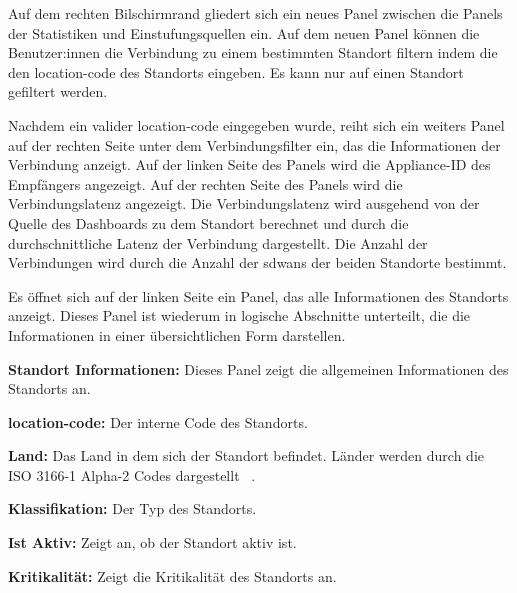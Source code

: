 \begin{compactitem}
\begin{compactitem}
        Auf dem rechten Bilschirmrand gliedert sich ein neues Panel zwischen die Panels der Statistiken und Einstufungsquellen ein.
        Auf dem neuen Panel können die Benutzer:innen die Verbindung zu einem bestimmten Standort filtern 
        indem die den \gls{location-code} des Standorts eingeben. Es kann nur auf einen Standort gefiltert werden.
        
        Nachdem ein valider \gls{location-code} eingegeben wurde, 
        reiht sich ein weiters Panel auf der rechten Seite unter dem Verbindungsfilter ein, das die Informationen der Verbindung anzeigt.
        Auf der linken Seite des Panels wird die Appliance-ID des Empfängers angezeigt.
        Auf der rechten Seite des Panels wird die Verbindungslatenz angezeigt.
        Die Verbindungslatenz wird ausgehend von der Quelle des Dashboards zu dem Standort berechnet
        und durch die durchschnittliche Latenz der Verbindung dargestellt.
        Die Anzahl der Verbindungen wird durch die Anzahl der \gls{sdwan}s der beiden Standorte bestimmt.

        Es öffnet sich auf der linken Seite ein Panel, das alle Informationen des Standorts anzeigt.
        Dieses Panel ist wiederum in logische Abschnitte unterteilt, die die Informationen in einer übersichtlichen Form darstellen.
    
        \begin{compactitem}
            \item \textbf{Standort Informationen:} Dieses Panel zeigt die allgemeinen Informationen des Standorts an.
            
            \begin{compactitem}
                \item \textbf{\gls{location-code}:} Der interne Code des Standorts.
                \item \textbf{Land:} Das Land in dem sich der Standort befindet. 
                Länder werden durch die ISO 3166-1 Alpha-2 Codes dargestellt ~\cite{iso3166glossary2026}.
                \item \textbf{Klassifikation:} Der Typ des Standorts.
                \item \textbf{Ist Aktiv:} Zeigt an, ob der Standort aktiv ist.
                \item \textbf{Kritikalität:} Zeigt die Kritikalität des Standorts an.


\end{compactitem}
\end{compactitem}
\end{compactitem}
\end{compactitem}
